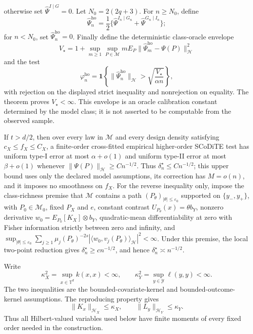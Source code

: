 otherwise set \(\widehat\Psi^{I\mid G}=0\).  Let \(N_0=2(2q+3)\).  For \(n\geq N_0\), define
\[
 \widehat\Psi_n^{\mathrm{ho}}
 =\frac12\{\widehat\Psi^{I_n\mid G_n}
                 +\widehat\Psi^{G_n\mid I_n}\};
\]
for \(n<N_0\), set \(\widehat\Psi_n^{\mathrm{ho}}=0\).  Finally define the deterministic class-oracle envelope
\[
 V_\star
 =1+\sup_{m\geq1}\sup_{P\in\mathcal M}
 mE_P\|\widehat\Psi_m^{\mathrm{ho}}-\Psi(P)\|_{\mathcal H}^2
\]
and the test
\[
 \varphi_n^{\mathrm{ho}}
 =\mathbf 1\left\{
 \|\widehat\Psi_n^{\mathrm{ho}}\|_{\mathcal H}
 >\sqrt{\frac{V_\star}{\alpha n}}
 \right\},
\]
with rejection on the displayed strict inequality and nonrejection on equality.  The theorem proves \(V_\star<\infty\).  This envelope is an oracle calibration constant determined by the model class; it is not asserted to be computable from the observed sample.

If \(t>d/2\), then over every law in \(\mathcal M\) and every design density satisfying \(c_X\le f_X\le C_X\), a finite-order cross-fitted empirical higher-order SCoDiTE test has uniform type-I error at most \(\alpha+o(1)\) and uniform type-II error at most \(\beta+o(1)\) whenever \(\|\Psi(P)\|_{\mathcal H}\ge Cn^{-1/2}\). Thus \(\delta_n^\star\le Cn^{-1/2}\); this upper bound uses only the declared model assumptions, its correction has \(M=o(n)\), and it imposes no smoothness on \(f_X\). For the reverse inequality only, impose the class-richness premise that \(\mathcal M\) contains a path \((P_\theta)_{|\theta|\le\varepsilon_0}\) supported on \(\{y_-,y_+\}\), with \(P_0\in\mathcal M_0\), fixed \(P_X\) and \(e\), constant contrast \(U_{P_\theta}(x)=\theta b_Y\), nonzero derivative \(w_0=E_{P_0}[K_X]\otimes b_Y\), quadratic-mean differentiability at zero with Fisher information strictly between zero and infinity, and \(\sup_{|\theta|\le\varepsilon_0}\sum_{j\ge1}\mu_j(P_\theta)^{-2s}|\langle w_0,v_j(P_\theta)\rangle_{\mathcal H}|^2<\infty\). Under this premise, the local two-point reduction gives \(\delta_n^\star\ge cn^{-1/2}\), and hence \(\delta_n^\star\asymp n^{-1/2}\).

Write
\[
 \kappa_X^2=\sup_{x\in\mathbb T^d}k(x,x)<\infty,
 \qquad
 \kappa_Y^2=\sup_{y\in\mathcal Y}\ell(y,y)<\infty.
 \tag{1}
\]
The two inequalities are the bounded-covariate-kernel and bounded-outcome-kernel assumptions.  The reproducing property gives
\[
 \|K_x\|_{\mathcal H_X}\leq\kappa_X,
 \qquad
 \|L_y\|_{\mathcal H_Y}\leq\kappa_Y.
 \tag{2}
\]
Thus all Hilbert-valued variables used below have finite moments of every fixed order needed in the construction.

